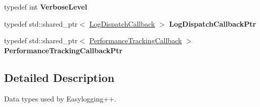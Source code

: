 \begin{DoxyCompactItemize}
typedef int {\bfseries Verbose\+Level}
\item 
\mbox{\label{namespaceel_1_1base_1_1type_a887283511935c7a6d5ca99df8099f33f}} 
typedef std\+::shared\+\_\+ptr$<$ \hyperlink{classel_1_1_log_dispatch_callback}{Log\+Dispatch\+Callback} $>$ {\bfseries Log\+Dispatch\+Callback\+Ptr}
\item 
\mbox{\label{namespaceel_1_1base_1_1type_a01a715419060d65c31b71fd8d067abdd}} 
typedef std\+::shared\+\_\+ptr$<$ \hyperlink{classel_1_1_performance_tracking_callback}{Performance\+Tracking\+Callback} $>$ {\bfseries Performance\+Tracking\+Callback\+Ptr}
\end{DoxyCompactItemize}


\subsection{Detailed Description}
Data types used by Easylogging++. 